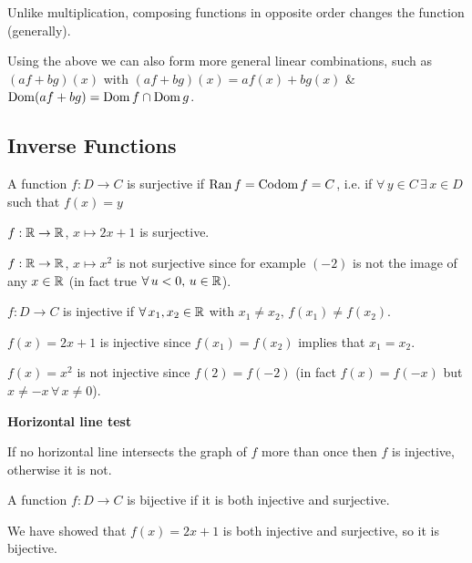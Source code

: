 \documentclass[10pt, a4paper]{article}
\begin{document}
Unlike multiplication, composing functions in opposite order changes the function (generally).

Using the above we can also form more general linear combinations, such as $(af + bg)(x)$ with $(af + bg)(x) = af(x) + bg(x)$ \& $\operatorname{Dom} (af + bg) = \operatorname{Dom} f \cap \operatorname{Dom} g$.

\subsection{Inverse Functions}
\begin{definition}
    A function $f : D \rightarrow C$ is surjective if $\operatorname{Ran} f = \mathrm{Codom}\, f = C$, i.e. if $\forall\, y \in C\, \exists\, x \in D$ such that $f(x) = y$
\end{definition}
\begin{example}
    $f : \mathbb{R} \rightarrow \mathbb{R}$, $x \mapsto 2x + 1$ is surjective.

    $f : \mathbb{R} \rightarrow \mathbb{R}$, $x \mapsto x ^ 2$ is not surjective since for example $(-2)$ is not the image of any $x \in \mathbb{R}$ (in fact true $\forall\,u < 0,\, u \in \mathbb{R}$).
\end{example}

\begin{definition}
    $f : D \rightarrow C$ is injective if $\forall\, x_1, x_2 \in \mathbb{R}$ with $x_1 \neq x_2,\, f(x_1) \neq f(x_2)$.
\end{definition}

\begin{example}
    $f(x) = 2x + 1$ is injective since $f(x_1) = f(x_2)$ implies that $x_1 = x_2$.

    $f(x) = x ^ 2$ is not injective since $f(2) = f(-2)$ (in fact $f(x) = f(-x)$ but $x \neq -x\, \forall\, x\neq 0$).
\end{example}

\textbf{Horizontal line test}

If no horizontal line intersects the graph of $f$ more than once then $f$ is injective, otherwise it is not.

\begin{definition}
    A function $f : D \rightarrow C$ is bijective if it is both injective and surjective.
\end{definition}

\begin{example}
    We have showed that $f(x) = 2x + 1$ is both injective and surjective, so it is bijective.
\end{example}
\end{document}
